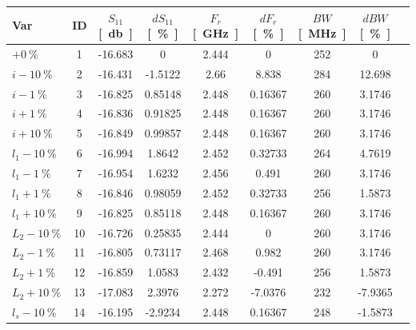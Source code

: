 \documentclass[Deriaz_Traiber_Labo02]{subfiles}
\begin{document}
\begin{table}[H]
\centering
\begin{tabular}{|l|c|cc|cc|cc|c|}\hline
	Var 		   	& ID  &  $S_{11}$ \si{[\decibel]} &  $dS_{11}$ \si{[\percent]}   &  $F_r$ \si{[\giga\hertz]} &   $dF_r$ \si{[\percent]}  & $BW$\si{[\mega\hertz]} &   $dBW$ \si{[\percent]}\\ \hline\hline
    $  +    \SI{ 0}{\percent}    $ &   1   & -16.683   &          0   & 2.444    &       0   &  252    &          0\\\hline
    $ i -   \SI{10}{\percent}    $ &    2  &  -16.431  &     -1.5122  &   2.66   &    8.838  &   284   &     12.698\\
    $ i -   \SI{ 1}{\percent}    $ &     3 &   -16.825 &      0.85148 &   2.448  &   0.16367 &    260  &     3.1746\\
    $ i +   \SI{ 1}{\percent}    $ &     4 &   -16.836 &      0.91825 &   2.448  &   0.16367 &    260  &     3.1746\\
    $ i +   \SI{10}{\percent}    $ &    5  &  -16.849  &     0.99857  &  2.448   &  0.16367  &   260   &     3.1746\\\hline
    $ l_1 - \SI{10}{\percent}    $ &    6  &  -16.994  &      1.8642  &  2.452   &  0.32733  &   264   &     4.7619\\
    $ l_1 - \SI{ 1}{\percent}    $ &     7 &   -16.954 &       1.6232 &   2.456  &     0.491 &    260  &     3.1746\\
    $ l_1 + \SI{ 1}{\percent}    $ &     8 &   -16.846 &      0.98059 &   2.452  &   0.32733 &    256  &     1.5873\\
    $ l_1 + \SI{10}{\percent}    $ &    9  &  -16.825  &     0.85118  &  2.448   &  0.16367  &   260   &     3.1746\\\hline
    $ L_2 - \SI{10}{\percent}    $ &   10  &  -16.726  &     0.25835  &  2.444   &        0  &   260   &     3.1746\\
    $ L_2 - \SI{ 1}{\percent}    $ &    11 &   -16.805 &      0.73117 &   2.468  &     0.982 &    260  &     3.1746\\
    $ L_2 + \SI{ 1}{\percent}    $ &    12 &   -16.859 &       1.0583 &   2.432  &    -0.491 &    256  &     1.5873\\
    $ L_2 + \SI{10}{\percent}    $ &   13  &  -17.083  &      2.3976  &  2.272   &  -7.0376  &   232   &    -7.9365\\\hline
    $ l_s - \SI{10}{\percent}    $ &   14  &  -16.195  &     -2.9234  &  2.448   &  0.16367  &   248   &    -1.5873\\

\end{tabular}
\end{table}
\end{document}

